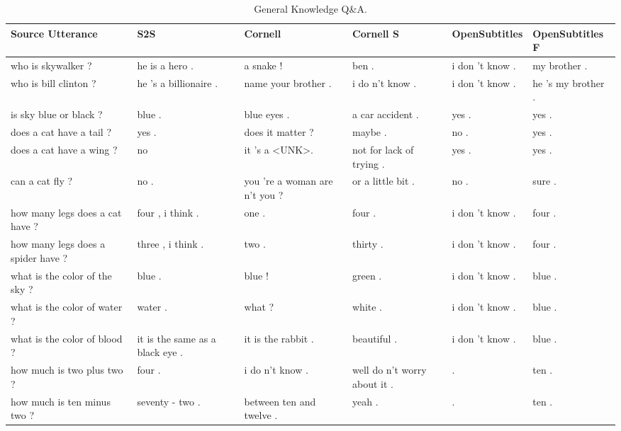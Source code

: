 \documentclass[12pt]{article}
\begin{document}
\begin{table}[H]
	\centering
	\begin{tabular}{|L{2.3cm}|L{2.3cm}|L{2.3cm}|L{2.3cm}|L{2.3cm}|L{2.3cm}|}
		\hline
		\textbf{Source Utterance} & \textbf{S2S} & \textbf{Cornell} & \textbf{Cornell S} & \textbf{OpenSubtitles} & \textbf{OpenSubtitles F}\\ \hline
		who is skywalker ? & he is a hero . & a snake ! & ben . & i don 't know . & my brother . 
		\\ \hline
		who is bill clinton ? & he 's a billionaire . & name your brother . & i do n't know . & i don 't know . & he 's my brother . 
		\\ \hline
		is sky blue or black ? & blue . & blue eyes . & a car accident . & yes . & yes .
		\\ \hline
		does a cat have a tail ? & yes . & does it matter ?  & maybe . & no . & yes .
		\\ \hline
		does a cat have a wing ? & no & it 's a \textless UNK\textgreater . & not for lack of trying . & yes . & yes .
		\\ \hline
		can a cat fly ? & no . & you 're a woman are n't you ? & or a little bit . & no . & sure . 
		\\ \hline
		how many legs does a cat have ? & four , i think . & one .  & four . & i don 't know . & four .
		\\ \hline
		how many legs does a spider have ? & three , i think . & two . & thirty . & i don 't know . & four . 
		\\ \hline
		what is the color of the sky ? & blue . & blue !  & green . & i don 't know . & blue .
		\\ \hline
		what is the color of water ? & water . & what ? & white . & i don 't know . & blue .
		\\ \hline
		what is the color of blood ? & it is the same as a black eye . & it is the rabbit . & beautiful . & i don 't know . & blue .
		\\ \hline
		how much is two plus two ? & four . & i do n't know . & well do n't worry about it . & . & ten . 
		\\ \hline
		how much is ten minus two ? & seventy - two . & between ten and twelve .  & yeah . & . & ten . 
		\\ \hline
		
	\end{tabular}
	\caption{General Knowledge Q\&A.}	
	\label{table:genKnowledgeNCM}
\end{table}
\end{document}
